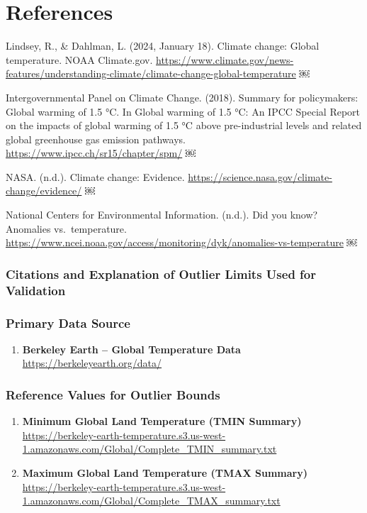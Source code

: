 \documentclass[
  letterpaper,
  DIV=11,
  numbers=noendperiod]{scrartcl}
\providecommand{\tightlist}{%
  \setlength{\itemsep}{0pt}\setlength{\parskip}{0pt}}
\begin{document}
\section{References}\label{references}

Lindsey, R., \& Dahlman, L. (2024, January 18). Climate change: Global
temperature. NOAA Climate.gov.
\url{https://www.climate.gov/news-features/understanding-climate/climate-change-global-temperature}
￼

Intergovernmental Panel on Climate Change. (2018). Summary for
policymakers: Global warming of 1.5 °C. In Global warming of 1.5 °C: An
IPCC Special Report on the impacts of global warming of 1.5 °C above
pre-industrial levels and related global greenhouse gas emission
pathways. \url{https://www.ipcc.ch/sr15/chapter/spm/} ￼

NASA. (n.d.). Climate change: Evidence.
\url{https://science.nasa.gov/climate-change/evidence/} ￼

National Centers for Environmental Information. (n.d.). Did you know?
Anomalies vs.~temperature.
\url{https://www.ncei.noaa.gov/access/monitoring/dyk/anomalies-vs-temperature}
￼

\subsubsection{Citations and Explanation of Outlier Limits Used for
Validation}\label{citations-and-explanation-of-outlier-limits-used-for-validation}

\subsubsection{Primary Data Source}\label{primary-data-source}

\begin{enumerate}
\def\labelenumi{\arabic{enumi}.}
\tightlist
\item
  \textbf{Berkeley Earth -- Global Temperature Data}\\
  \url{https://berkeleyearth.org/data/}
\end{enumerate}

\subsubsection{Reference Values for Outlier
Bounds}\label{reference-values-for-outlier-bounds}

\begin{enumerate}
\def\labelenumi{\arabic{enumi}.}
\setcounter{enumi}{1}
\item
  \textbf{Minimum Global Land Temperature (TMIN Summary)}\\
  \url{https://berkeley-earth-temperature.s3.us-west-1.amazonaws.com/Global/Complete_TMIN_summary.txt}
\item
  \textbf{Maximum Global Land Temperature (TMAX Summary)}\\
  \url{https://berkeley-earth-temperature.s3.us-west-1.amazonaws.com/Global/Complete_TMAX_summary.txt}
\end{enumerate}
\end{document}
